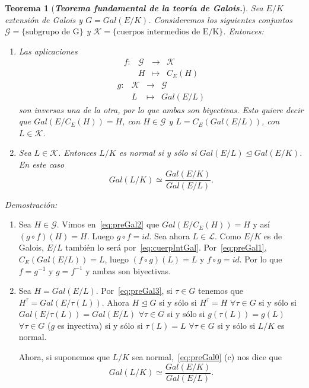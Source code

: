 \documentclass[12pt]{article}
\newtheorem{theorem}{Teorema}[section]
\begin{document}
\begin{theorem}[\textbf{\textit{Teorema fundamental de la teoría de Galois.}}]Sea $E/K$ extensión de Galois y $G = Gal(E/K)$. Consideremos los siguientes conjuntos $\mathcal{G} = \lbrace \text{subgrupo de G} \rbrace$ y $\mathcal{K} = \lbrace \text{cuerpos intermedios de E/K} \rbrace$. Entonces:
\begin{enumerate}
\item Las aplicaciones $$\begin{array}{rccl}
f \colon &\mathcal{G}&\longrightarrow &\mathcal{K} \\
&H& \longmapsto &C_{E}(H)
\end{array}
$$
 $$\begin{array}{rccl}
g \colon &\mathcal{K}&\longrightarrow &\mathcal{G} \\
&L& \longmapsto &Gal(E/L)
\end{array}
$$
son inversas una de la otra, por lo que ambas son biyectivas. Esto quiere decir que $Gal(E/C_{E}(H)) = H$, con $H \in \mathcal{G}$ y $L = C_{E}(Gal(E/L))$, con $L \in \mathcal{K}$.

\item Sea $L \in \mathcal{K}$. Entonces $L/K$ es normal si y sólo si $Gal(E/L) \unlhd Gal(E/K)$. En este caso $$Gal(L/K) \simeq \dfrac{Gal(E/K)}{Gal(E/L)}.$$
\end{enumerate}
\end{theorem}
\emph{Demostración: }
\begin{enumerate}
\item Sea $H \in \mathcal{G}$. Vimos en~\ref{eq:preGal2} que $Gal(E/C_{E}(H)) = H$ y así $(g \circ f)(H)=H$. Luego $g \circ f = id$. Sea ahora $L \in \mathcal{L}$. Como $E/K$ es de Galois, $E/L$ también lo será por~\ref{eq:cuerpIntGal}. Por~\ref{eq:preGal1}, $C_{E}(Gal(E/L)) = L$, luego $(f\circ g)(L) = L$ y $f\circ g = id$. Por lo que $f = g^{-1}$ y $g = f^{-1}$ y ambas son biyectivas.
\item Sea $H = Gal(E/L)$. Por~\ref{eq:preGal3}, si $\tau \in G$ tenemos que $H^{\tau}= Gal(E/\tau(L))$. Ahora $H \unlhd G$ si y sólo si $H^{\tau} = H$ $\forall \tau \in G$ si y sólo si $Gal(E/\tau (L)) = Gal(E/L)$ $\forall \tau \in G$ si y sólo si $g(\tau(L)) = g(L)$ $\forall \tau \in G$ ($g$ es inyectiva) si y sólo si $\tau (L) = L$ $\forall \tau \in G$ si y sólo si $L/K$ es normal.

Ahora, si suponemos que $L/K$ sea normal,~\ref{eq:preGal0} (c) nos dice que $$Gal(L/K) \simeq \dfrac{Gal(E/K)}{Gal(E/L)}.$$
\end{enumerate}
\end{document}
